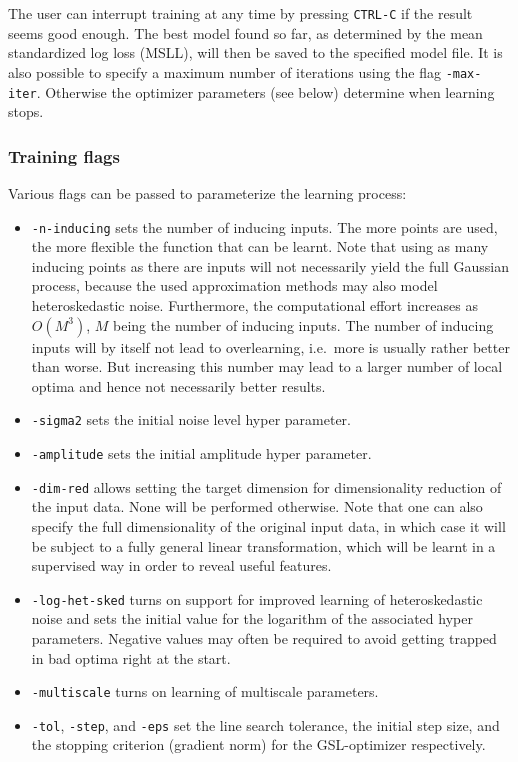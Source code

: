 \documentclass[10pt]{report}
\begin{document}
The user can interrupt training at any time by pressing \verb=CTRL-C= if the
result seems good enough.  The best model found so far, as determined by the
mean standardized log loss (MSLL), will then be saved to the specified model
file.  It is also possible to specify a maximum number of iterations using the
flag \verb=-max-iter=.  Otherwise the optimizer parameters (see below) determine
when learning stops.\\

\subsubsection{Training flags}

Various flags can be passed to parameterize the learning process:

\begin{itemize}
\item \verb=-n-inducing= sets the number of inducing inputs.  The more points
are used, the more flexible the function that can be learnt.  Note that using as
many inducing points as there are inputs will not necessarily yield the full
Gaussian process, because the used approximation methods may also model
heteroskedastic noise.  Furthermore, the computational effort increases as
$O(M^3)$, $M$ being the number of inducing inputs.  The number of inducing
inputs will by itself not lead to overlearning, i.e.\ more is usually rather
better than worse. But increasing this number may lead to a larger number of
local optima and hence not necessarily better results.
\item \verb=-sigma2= sets the initial noise level hyper parameter.
\item \verb=-amplitude= sets the initial amplitude hyper parameter.
\item \verb=-dim-red= allows setting the target dimension for dimensionality
reduction of the input data.  None will be performed otherwise.  Note that one
can also specify the full dimensionality of the original input data, in which
case it will be subject to a fully general linear transformation, which will be
learnt in a supervised way in order to reveal useful features.
\item \verb=-log-het-sked= turns on support for improved learning of
heteroskedastic noise and sets the initial value for the logarithm of the
associated hyper parameters.  Negative values may often be required to avoid
getting trapped in bad optima right at the start.
\item \verb=-multiscale= turns on learning of multiscale parameters.
\item \verb=-tol=, \verb=-step=, and \verb=-eps= set the line search tolerance,
the initial step size, and the stopping criterion (gradient norm) for the
GSL-optimizer respectively.
\end{itemize}
\end{document}
